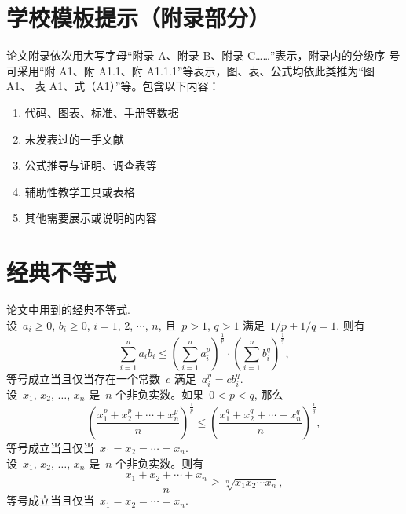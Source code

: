 \chapter{学校模板提示（附录部分）}

论文附录依次用大写字母“附录 A、附录 B、附录 C……”表示，附录内的分级序
号可采用“附 A1、附 A1.1、附 A1.1.1”等表示，图、表、公式均依此类推为“图 A1、
表 A1、式（A1）”等。包含以下内容：

\begin{enumerate}
    \item 代码、图表、标准、手册等数据
    \item 未发表过的一手文献
    \item 公式推导与证明、调查表等
    \item 辅助性教学工具或表格
    \item 其他需要展示或说明的内容
\end{enumerate}

\chapter{经典不等式}
论文中用到的经典不等式.\\

设~$a_i\geq0$, $b_i\geq0$, $i=1$, $2$, $\cdots$, $n$, 且~$p>1$, $q>1$ 
满足~$1/p+1/q=1$. 则有
\[
\sum_{i=1}^{n}a_ib_i\leq\left(\sum_{i=1}^{n}a_i^p\right)^{\frac1p}
\cdot\left(\sum_{i=1}^{n}b_i^q\right)^{\frac1q},
\]
等号成立当且仅当存在一个常数~$c$ 满足~$a_i^p=cb_i^q$.\\

设~$x_1$, $x_2$, $\ldots$, $x_n$ 是~$n$ 个非负实数。如果~$0<p<q$, 那么
\[
\left(\frac{x_1^p+x_2^p+\cdots+x_n^p}{n}\right)^{\frac{1}{p}}\leq
\left(\frac{x_1^q+x_2^q+\cdots+x_n^q}{n}\right)^{\frac{1}{q}},
\]
等号成立当且仅当~$x_1=x_2=\cdots =x_n$.\\

设~$x_1$, $x_2$, $\ldots$, $x_n$ 是~$n$ 个非负实数。则有
\[
\frac{x_1+x_2+\cdots+x_n}{n}\geq\sqrt[n]{x_1x_2\cdots x_n},
\]
等号成立当且仅当~$x_1=x_2=\cdots =x_n$.